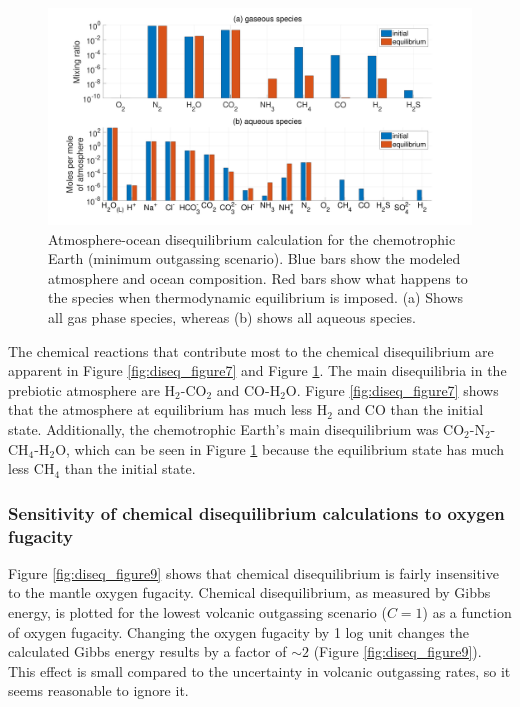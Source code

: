 \begin{figure}
  \centering
  \includegraphics[width=1.0\textwidth]{tex/2diseq/Figure8.pdf}
  \caption{Atmosphere-ocean disequilibrium calculation for the chemotrophic Earth (minimum outgassing scenario). Blue bars show the modeled atmosphere and ocean composition. Red bars show what happens to the species when thermodynamic equilibrium is imposed. (a) Shows all gas phase species, whereas (b) shows all aqueous species.}
  \label{fig:diseq_figure8}
\end{figure}

The chemical reactions that contribute most to the chemical disequilibrium are apparent in Figure \ref{fig:diseq_figure7} and Figure \ref{fig:diseq_figure8}. The main disequilibria in the prebiotic atmosphere are H$_2$-CO$_2$ and CO-H$_2$O. Figure \ref{fig:diseq_figure7} shows that the atmosphere at equilibrium has much less H$_2$ and CO than the initial state. Additionally, the chemotrophic Earth's main disequilibrium was CO$_2$-N$_2$-CH$_4$-H$_2$O, which can be seen in Figure \ref{fig:diseq_figure8} because the equilibrium state has much less CH$_4$ than the initial state.

\subsubsection{Sensitivity of chemical disequilibrium calculations to oxygen fugacity} \label{sec:diseq_b3}

Figure \ref{fig:diseq_figure9} shows that chemical disequilibrium is fairly insensitive to the mantle oxygen fugacity. Chemical disequilibrium, as measured by Gibbs energy, is plotted for the lowest volcanic outgassing scenario ($C = 1$) as a function of oxygen fugacity. Changing the oxygen fugacity by 1 log unit changes the calculated Gibbs energy results by a factor of $\sim 2$ (Figure \ref{fig:diseq_figure9}). This effect is small compared to the uncertainty in volcanic outgassing rates, so it seems reasonable to ignore it.

